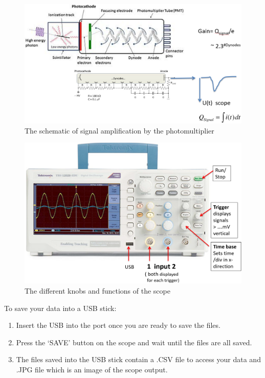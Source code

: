 \documentclass[10pt,aps,twocolumn,secnumarabic,balancelastpage,amsmath,amssymb,nofootinbib,floatfix]{revtex4}
\begin{document}
\begin{figure}
  \centering
  \includegraphics[width=1.0\linewidth]{figs/photomultipliertube.png}
  \caption{The schematic of signal amplification by the photomultiplier}
  \label{fig:photomultiplier-tube}
\end{figure}

\begin{figure}
  \centering
  \includegraphics[width=1.0\linewidth]{figs/morescope.png}
  \caption{The different knobs and functions of the scope}
  \label{fig:morescope}
\end{figure}

To save your data into a USB stick:
\begin{enumerate}
\item Insert the USB into the port once you are ready to save the files. 
\item Press the `SAVE' button on the scope and wait until the files are all saved. 
\item The files saved into the USB stick contain a .CSV file to access your data and .JPG file which is an image of the scope output. 
\end{enumerate}
\end{document}
